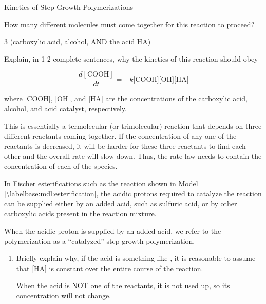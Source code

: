 \begin{activity}{Kinetics of Step-Growth Polymerizations}
\begin{ctqs}
		\question How many different molecules must come together for this reaction to proceed?
		
			\begin{solution}[0.5in]
				3 (carboxylic acid, alcohol, AND the acid HA)
			\end{solution}
		
		\question Explain, in 1-2 complete sentences, why the kinetics of this reaction should obey
		
			\begin{equation*}
				\frac{d[\text{COOH}]}{dt} = - k \text{[COOH][OH][HA]}
			\end{equation*}
			
			where [COOH], [OH], and [HA] are the concentrations of the carboxylic acid, alcohol, and acid catalyst, respectively.\label{\labelbase:ctq:fisherratelaw}
			
				\begin{solution}[1.25in]
					This is essentially a termolecular (or trimolecular) reaction that depends on three different reactants coming together.  If the concentration of any one of the reactants is decreased, it will be harder for these three reactants to find each other and the overall rate will slow down.  Thus, the rate law needs to contain the concentration of each of the species.
				\end{solution}
		
\end{ctqs}

\begin{infobox}
	In Fischer esterifications such as the reaction shown in Model \ref{\labelbase:mdl:esterification}, the acidic protons required to catalyze the reaction can be supplied either by an added acid, such as sulfuric acid, or by other carboxylic acids present in the reaction mixture.
\end{infobox}

\begin{ctqs}
	
	\question When the acidic proton is supplied by an added acid, we refer to the polymerization as a ``catalyzed'' step-growth polymerization.
	
		\begin{enumerate}
			\item Briefly explain why, if the acid is something like , it is reasonable to assume that [HA] is constant over the entire course of the reaction.
			
				\begin{solution}[0.5in]
					When the acid is NOT one of the reactants, it is not used up, so its concentration will not change.
				\end{solution}
			

\end{enumerate}
\end{ctqs}
\end{activity}

